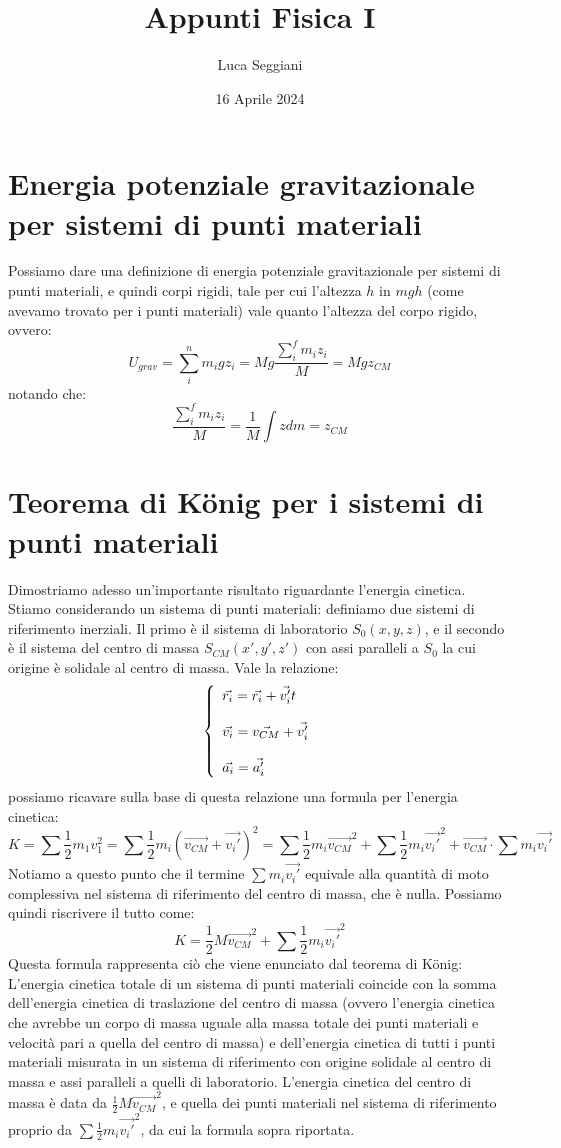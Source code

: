 \documentclass[a4paper,12pt]{article}
\title{Appunti Fisica I}
\author{Luca Seggiani}
\date{16 Aprile 2024}
\begin{document}
\maketitle
\section{Energia potenziale gravitazionale per sistemi di punti materiali}
Possiamo dare una definizione di energia potenziale gravitazionale per sistemi di punti materiali, e quindi corpi rigidi,
tale per cui l'altezza $h$ in $mgh$ (come avevamo trovato per i punti materiali) vale quanto l'altezza del corpo rigido, ovvero:
$$ U_{grav} = \sum_i^n m_igz_i = Mg \frac{\sum_i^f m_iz_i}{M} = Mgz_{CM}$$
notando che:
$$ \frac{\sum_i^f m_iz_i}{M} = \frac{1}{M}\int zdm = z_{CM}$$
\section{Teorema di König per i sistemi di punti materiali}
Dimostriamo adesso un'importante risultato riguardante l'energia cinetica.
Stiamo considerando un sistema di punti materiali: definiamo due sistemi di riferimento inerziali. Il primo è
il sistema di laboratorio $S_0(x,y,z)$, e il secondo è il sistema del centro di massa $S_{CM}(x',y',z')$ con assi
paralleli a $S_0$ la cui origine è solidale al centro di massa. Vale la relazione:
$$ 
\left\{\begin{array}{l}
    \vec{r_i} = \vec{r_i} + \vec{v_i'}t \cr \\ 
    \vec{v_i} = \vec{v_{CM}} + \vec{v_i'} \cr \\
    \vec{a_i} = \vec{a_i'}
\end{array}\right.
$$
possiamo ricavare sulla base di questa relazione una formula per l'energia cinetica:
$$ K = \sum \frac{1}{2}m_1v_1^2 = \sum \frac{1}{2} m_i(\vec{v_{CM}} + \vec{v_i'})^2 = \sum \frac{1}{2} m_i\vec{v_{CM}}^2  + \sum \frac{1}{2}m_i\vec{v_i'}^2 + \vec{v_{CM}} \cdot \sum m_i\vec{v_i'}$$
Notiamo a questo punto che il termine $\sum m_i\vec{v_i'}$ equivale alla quantità di moto complessiva nel sistema di riferimento
del centro di massa, che è nulla. Possiamo quindi riscrivere il tutto come:
$$ K = \frac{1}{2}M\vec{v_{CM}}^2 + \sum \frac{1}{2}m_i\vec{v_i'}^2 $$
Questa formula rappresenta ciò che viene enunciato dal teorema di König:
L'energia cinetica totale di un sistema di punti materiali coincide con la somma dell'energia cinetica
di traslazione del centro di massa (ovvero l'energia cinetica che avrebbe un corpo di massa uguale alla massa totale
dei punti materiali e velocità pari a quella del centro di massa)
e dell'energia cinetica di tutti i punti materiali misurata in un sistema
di riferimento con origine solidale al centro di massa e assi paralleli a quelli di laboratorio. L'energia cinetica
del centro di massa è data da $\frac{1}{2}M\vec{v_{CM}}^2$, e quella dei punti materiali nel sistema di riferimento proprio da
$ \sum \frac{1}{2}m_i\vec{v_i'}^2 $, da cui la formula sopra riportata.
\end{document}

